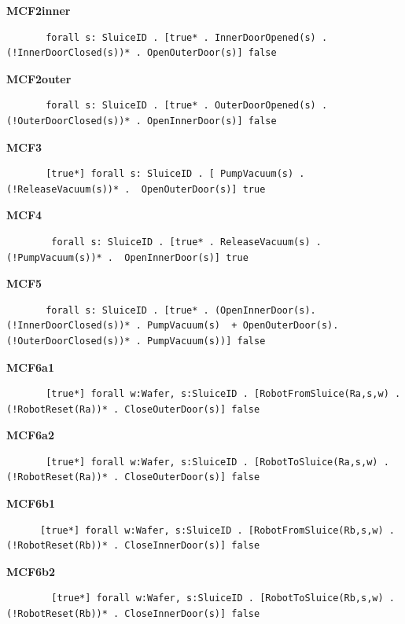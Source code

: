 \documentclass[12pt]{report}
\begin{document}
    \textbf{MCF2inner}
    \begin{lstlisting}
       forall s: SluiceID . [true* . InnerDoorOpened(s) . (!InnerDoorClosed(s))* . OpenOuterDoor(s)] false
       \end{lstlisting}

    \textbf{MCF2outer}
    \begin{lstlisting}
       forall s: SluiceID . [true* . OuterDoorOpened(s) . (!OuterDoorClosed(s))* . OpenInnerDoor(s)] false
       \end{lstlisting}

    \textbf{MCF3}
    \begin{lstlisting}
       [true*] forall s: SluiceID . [ PumpVacuum(s) . (!ReleaseVacuum(s))* .  OpenOuterDoor(s)] true
       \end{lstlisting}

    \textbf{MCF4}
    \begin{lstlisting}
        forall s: SluiceID . [true* . ReleaseVacuum(s) . (!PumpVacuum(s))* .  OpenInnerDoor(s)] true
        \end{lstlisting}

    \textbf{MCF5}
    \begin{lstlisting}
       forall s: SluiceID . [true* . (OpenInnerDoor(s). (!InnerDoorClosed(s))* . PumpVacuum(s)  + OpenOuterDoor(s). (!OuterDoorClosed(s))* . PumpVacuum(s))] false
       \end{lstlisting}

    \textbf{MCF6a1}
    \begin{lstlisting}
       [true*] forall w:Wafer, s:SluiceID . [RobotFromSluice(Ra,s,w) . (!RobotReset(Ra))* . CloseOuterDoor(s)] false
       \end{lstlisting}

    \textbf{MCF6a2}
    \begin{lstlisting}
       [true*] forall w:Wafer, s:SluiceID . [RobotToSluice(Ra,s,w) . (!RobotReset(Ra))* . CloseOuterDoor(s)] false
    \end{lstlisting}
	
    \textbf{MCF6b1}
    \begin{lstlisting}
      [true*] forall w:Wafer, s:SluiceID . [RobotFromSluice(Rb,s,w) . (!RobotReset(Rb))* . CloseInnerDoor(s)] false
    \end{lstlisting}

    \textbf{MCF6b2}
    \begin{lstlisting}
        [true*] forall w:Wafer, s:SluiceID . [RobotToSluice(Rb,s,w) . (!RobotReset(Rb))* . CloseInnerDoor(s)] false
    \end{lstlisting}
\end{document}
